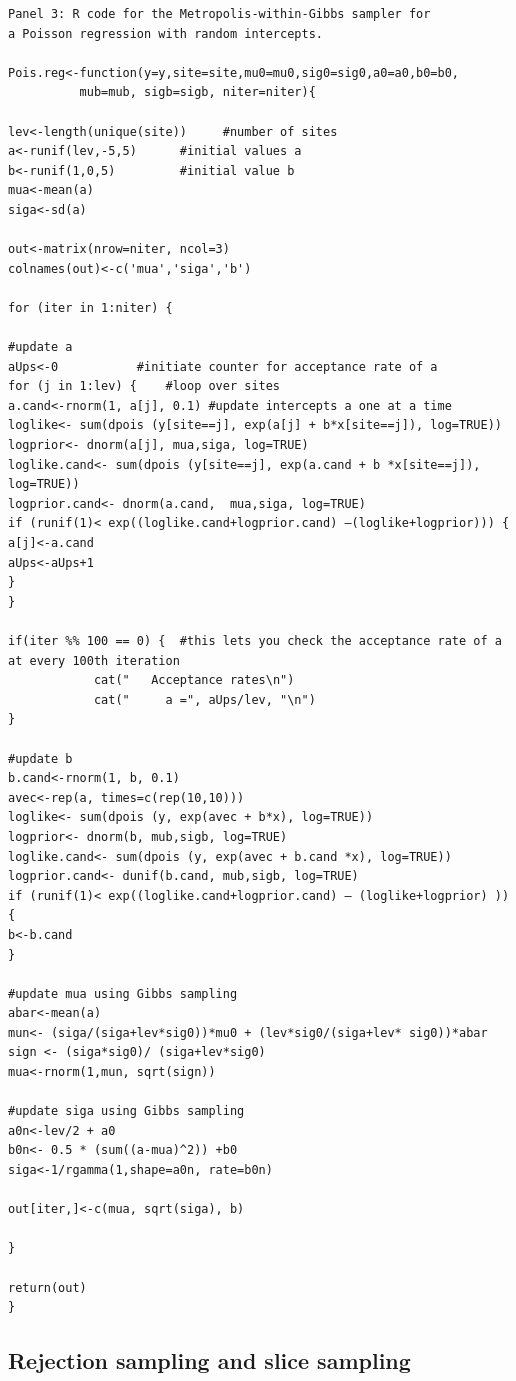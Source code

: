 {\small
\begin{verbatim}
Panel 3: R code for the Metropolis-within-Gibbs sampler for 
a Poisson regression with random intercepts.

Pois.reg<-function(y=y,site=site,mu0=mu0,sig0=sig0,a0=a0,b0=b0, 
          mub=mub, sigb=sigb, niter=niter){

lev<-length(unique(site))     #number of sites
a<-runif(lev,-5,5)		#initial values a
b<-runif(1,0,5)			#initial value b
mua<-mean(a)
siga<-sd(a)

out<-matrix(nrow=niter, ncol=3)	
colnames(out)<-c('mua','siga','b')

for (iter in 1:niter) {

#update a
aUps<-0			  #initiate counter for acceptance rate of a
for (j in 1:lev) { 	  #loop over sites 
a.cand<-rnorm(1, a[j], 0.1)	#update intercepts a one at a time
loglike<- sum(dpois (y[site==j], exp(a[j] + b*x[site==j]), log=TRUE))  
logprior<- dnorm(a[j], mua,siga, log=TRUE)
loglike.cand<- sum(dpois (y[site==j], exp(a.cand + b *x[site==j]), log=TRUE))
logprior.cand<- dnorm(a.cand,  mua,siga, log=TRUE)
if (runif(1)< exp((loglike.cand+logprior.cand) –(loglike+logprior))) {
a[j]<-a.cand
aUps<-aUps+1
}
}

if(iter %% 100 == 0) {  #this lets you check the acceptance rate of a at every 100th iteration
            cat("   Acceptance rates\n")
            cat("     a =", aUps/lev, "\n")
}

#update b
b.cand<-rnorm(1, b, 0.1)
avec<-rep(a, times=c(rep(10,10)))
loglike<- sum(dpois (y, exp(avec + b*x), log=TRUE))  
logprior<- dnorm(b, mub,sigb, log=TRUE)
loglike.cand<- sum(dpois (y, exp(avec + b.cand *x), log=TRUE))  
logprior.cand<- dunif(b.cand, mub,sigb, log=TRUE)
if (runif(1)< exp((loglike.cand+logprior.cand) – (loglike+logprior) )) {
b<-b.cand
}

#update mua using Gibbs sampling
abar<-mean(a)
mun<- (siga/(siga+lev*sig0))*mu0 + (lev*sig0/(siga+lev* sig0))*abar 
sign <- (siga*sig0)/ (siga+lev*sig0)
mua<-rnorm(1,mun, sqrt(sign))

#update siga using Gibbs sampling
a0n<-lev/2 + a0
b0n<- 0.5 * (sum((a-mua)^2)) +b0
siga<-1/rgamma(1,shape=a0n, rate=b0n)

out[iter,]<-c(mua, sqrt(siga), b)

}

return(out)
}
\end{verbatim}
}

\subsection{Rejection sampling and slice sampling }

